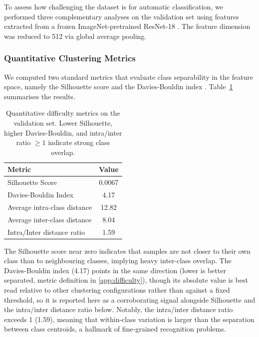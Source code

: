 To assess how challenging the dataset is for automatic classification, we performed three complementary analyses on the validation set using features extracted from a frozen ImageNet-pretrained ResNet-18 \citep{he2016deep}. The feature dimension was reduced to 512 via global average pooling.

\subsubsection{Quantitative Clustering Metrics}

We computed two standard metrics that evaluate class separability in the feature space, namely the Silhouette score \citep{rousseeuw1987silhouettes} and the Davies-Bouldin index \citep{davies1979cluster}. Table~\ref{tab:difficulty_metrics} summarises the results.

\begin{table}[htbp]
\centering
\caption{Quantitative difficulty metrics on the validation set. Lower Silhouette, higher Davies-Bouldin, and intra/inter ratio $\ge 1$ indicate strong class overlap.}
\label{tab:difficulty_metrics}
\begin{tabular}{l c}
\toprule
\textbf{Metric} & \textbf{Value} \\
\midrule
Silhouette Score & 0.0067 \\
Davies-Bouldin Index & 4.17 \\
Average intra-class distance & 12.82 \\
Average inter-class distance & 8.04 \\
Intra/Inter distance ratio & 1.59 \\
\bottomrule
\end{tabular}
\end{table}

The Silhouette score near zero indicates that samples are not closer to their own class than to neighbouring classes, implying heavy inter-class overlap. The Davies-Bouldin index (4.17) points in the same direction (lower is better separated, metric definition in \ref{app:difficulty}), though its absolute value is best read relative to other clustering configurations rather than against a fixed threshold, so it is reported here as a corroborating signal alongside Silhouette and the intra/inter distance ratio below. Notably, the intra/inter distance ratio exceeds 1 (1.59), meaning that within-class variation is larger than the separation between class centroids, a hallmark of fine-grained recognition problems.

